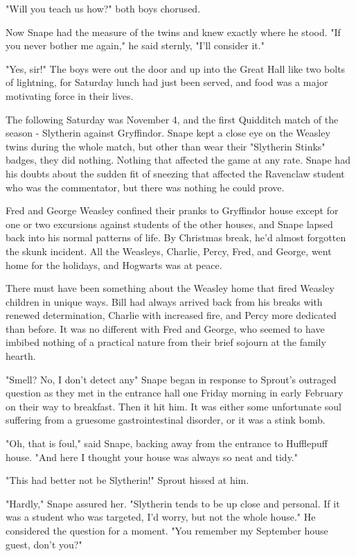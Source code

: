 "Will you teach us how?" both boys chorused.

Now Snape had the measure of the twins and knew exactly where he stood. "If you never bother me again," he said sternly, "I'll consider it."

"Yes, sir!" The boys were out the door and up into the Great Hall like two bolts of lightning, for Saturday lunch had just been served, and food was a major motivating force in their lives.

The following Saturday was November 4, and the first Quidditch match of the season - Slytherin against Gryffindor. Snape kept a close eye on the Weasley twins during the whole match, but other than wear their "Slytherin Stinks" badges, they did nothing. Nothing that affected the game at any rate. Snape had his doubts about the sudden fit of sneezing that affected the Ravenclaw student who was the commentator, but there was nothing he could prove.

Fred and George Weasley confined their pranks to Gryffindor house except for one or two excursions against students of the other houses, and Snape lapsed back into his normal patterns of life. By Christmas break, he'd almost forgotten the skunk incident. All the Weasleys, Charlie, Percy, Fred, and George, went home for the holidays, and Hogwarts was at peace.

There must have been something about the Weasley home that fired Weasley children in unique ways. Bill had always arrived back from his breaks with renewed determination, Charlie with increased fire, and Percy more dedicated than before. It was no different with Fred and George, who seemed to have imbibed nothing of a practical nature from their brief sojourn at the family hearth.

"Smell? No, I don't detect any{\el}" Snape began in response to Sprout's outraged question as they met in the entrance hall one Friday morning in early February on their way to breakfast. Then it hit him. It was either some unfortunate soul suffering from a gruesome gastrointestinal disorder, or it was a stink bomb.

"Oh, that is foul," said Snape, backing away from the entrance to Hufflepuff house. "And here I thought your house was always so neat and tidy."

"This had better not be Slytherin!" Sprout hissed at him.

"Hardly," Snape assured her. "Slytherin tends to be up close and personal. If it was a student who was targeted, I'd worry, but not the whole house." He considered the question for a moment. "You remember my September house guest, don't you?"

